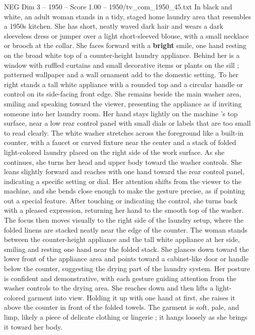 \begin{textsample}{NEG Dim 3 – 1950 – Score 1.00 – 1950/tv\_com\_1950\_45.txt}  \label{ex:f3_neg_085}
In black and white, an adult woman stands in a tidy, staged home laundry area that resembles a 1950s kitchen.
She has short, neatly waved dark hair and wears a dark sleeveless dress or jumper over a light short-sleeved blouse, with a small necklace or brooch at the collar.
She faces forward with a \textbf{bright} smile, one hand resting on the broad white top of a counter-height laundry appliance.
Behind her is a window with ruffled curtains and small decorative items or plants on the sill ; patterned wallpaper and a wall ornament add to the domestic setting.
To her right stands a tall white appliance with a rounded top and a circular handle or control on its side-facing front edge.
She remains beside the main washer area, smiling and speaking toward the viewer, presenting the appliance as if inviting someone into her laundry room.
Her hand stays lightly on the machine ’s top surface, near a low rear control panel with small dials or labels that are too small to read clearly.
The white washer stretches across the foreground like a built-in counter, with a faucet or curved fixture near the center and a stack of folded light-colored laundry placed on the right side of the work surface.
As she continues, she turns her head and upper body toward the washer controls.
She leans slightly forward and reaches with one hand toward the rear control panel, indicating a specific setting or dial.
Her attention shifts from the viewer to the machine, and she bends close enough to make the gesture precise, as if pointing out a special feature.
After touching or indicating the control, she turns back with a pleased expression, returning her hand to the smooth top of the washer.
The focus then moves visually to the right side of the laundry setup, where the folded linens are stacked neatly near the edge of the counter.
The woman stands between the counter-height appliance and the tall white appliance at her side, smiling and resting one hand near the folded stack.
She glances down toward the lower front of the appliance area and points toward a cabinet-like door or handle below the counter, suggesting the drying part of the laundry system.
Her posture is confident and demonstrative, with each gesture guiding attention from the washer controls to the drying area.
She reaches down and then lifts a light-colored garment into view.
Holding it up with one hand at first, she raises it above the counter in front of the folded towels.
The garment is soft, pale, and limp, likely a piece of delicate clothing or lingerie ; it hangs loosely as she brings it toward her body.

\end{textsample}
